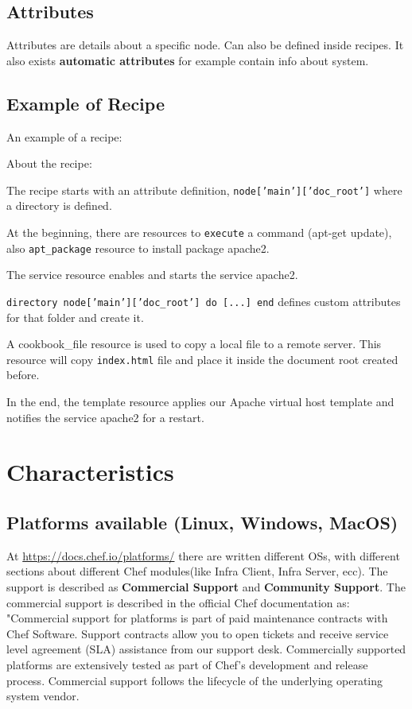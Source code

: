 \documentclass[12pt,a4paper,openright,twoside]{book}
\begin{document}
\subsection{Attributes}
Attributes are details about a specific node. Can also be defined inside recipes.
It also exists \textbf{automatic attributes} for example contain info about system.


\subsection{Example of Recipe}
An example of a recipe\cite{chefDigitalOcean}:



About the recipe:

The recipe starts with an attribute definition, \texttt{node['main']['doc\_root']} where a directory is defined.


At the beginning, there are resources to \texttt{execute} a command (apt-get update), also \texttt{apt\_package} resource to install package apache2.


The service resource enables and starts the service apache2.


\texttt{directory node['main']['doc\_root'] do [...] end} defines custom attributes for that folder and create it.

A cookbook\_file resource is used to copy a local file to a remote server. This resource will copy \texttt{index.html} file and place it inside the document root created before.


In the end, the template resource applies our Apache virtual host template and notifies the service apache2 for a restart.

\section{Characteristics}

\subsection{Platforms available (Linux, Windows, MacOS)}
At \url{https://docs.chef.io/platforms/} there are written different OSs, with different sections about different Chef modules(like Infra Client, Infra Server, ecc).
The support is described as \textbf{Commercial Support} and \textbf{Community Support}.
The commercial support is described in the official Chef documentation as:
"Commercial support for platforms is part of paid maintenance contracts with Chef Software. Support contracts allow you to open tickets and receive service level agreement (SLA) assistance from our support desk. Commercially supported platforms are extensively tested as part of Chef’s development and release process. Commercial support follows the lifecycle of the underlying operating system vendor.
\end{document}
